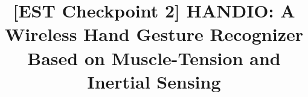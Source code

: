 \documentclass[conference]{IEEEtran}
\begin{document}
\title{[EST Checkpoint 2] HANDIO: A Wireless Hand Gesture Recognizer
Based on Muscle-Tension and Inertial Sensing}








%


\end{document}

